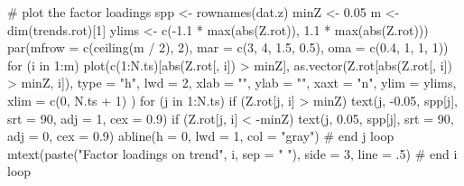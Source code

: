 \begin{Schunk}
\begin{Sinput}
 # plot the factor loadings
 spp <- rownames(dat.z)
 minZ <- 0.05
 m <- dim(trends.rot)[1]
 ylims <- c(-1.1 * max(abs(Z.rot)), 1.1 * max(abs(Z.rot)))
 par(mfrow = c(ceiling(m / 2), 2), mar = c(3, 4, 1.5, 0.5), oma = c(0.4, 1, 1, 1))
 for (i in 1:m) {
   plot(c(1:N.ts)[abs(Z.rot[, i]) > minZ], as.vector(Z.rot[abs(Z.rot[, i]) > minZ, i]),
     type = "h", lwd = 2, xlab = "", ylab = "", xaxt = "n", ylim = ylims, xlim = c(0, N.ts + 1)
   )
   for (j in 1:N.ts) {
     if (Z.rot[j, i] > minZ) {
       text(j, -0.05, spp[j], srt = 90, adj = 1, cex = 0.9)
     }
     if (Z.rot[j, i] < -minZ) {
       text(j, 0.05, spp[j], srt = 90, adj = 0, cex = 0.9)
     }
     abline(h = 0, lwd = 1, col = "gray")
   } # end j loop
   mtext(paste("Factor loadings on trend", i, sep = " "), side = 3, line = .5)
 } # end i loop
\end{Sinput}
\end{Schunk}

